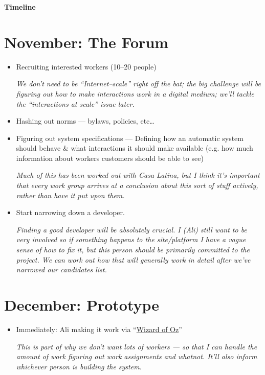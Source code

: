 \documentclass[11pt]{article}
\begin{document}
  \begin{center}
  \Large{\textbf{Timeline}}
  \end{center}

\section*{November: The Forum}
  \begin{itemize}
    \item Recruiting interested workers (10--20 people)

    \textit{We don't need to be ``Internet--scale'' right off the bat; the big challenge will be figuring out how to make interactions work in a digital medium; we'll tackle the ``interactions at scale'' issue later.}
    \item Hashing out norms ---
    bylaws, policies, etc\dots
    \item Figuring out system specifications ---
    Defining how an automatic system should behave \& what interactions it should make available
    (e.g. how much information about workers customers should be able to see)

    \textit{Much of this has been worked out with Casa Latina, but I think it's important that every work group arrives at a conclusion about this sort of stuff actively, rather than have it put upon them.}
    \item Start narrowing down a developer.

    \textit{Finding a good developer will be absolutely crucial.
    I (Ali) still want to be very involved so if something happens to the site/platform I have a vague sense of how to fix it,
    but this person should be primarily committed to the project.
    We can work out how that will generally work in detail after we've narrowed our candidates list.}
  \end{itemize}
\section*{December: Prototype}
  \begin{itemize}
    \item Immediately: Ali making it work via ``\href{https://en.wikipedia.org/wiki/Wizard_of_Oz_experiment}{Wizard of Oz}''

    \textit{This is part of why we don't want lots of workers --- so that I can handle the amount of work figuring out work assignments and whatnot. It'll also inform whichever person is building the system.}
  \end{itemize}
\end{document}
